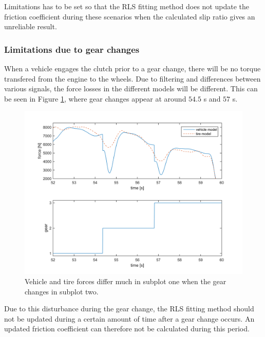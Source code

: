 Limitations has to be set so that the RLS fitting method does not update the friction coefficient during these scenarios when the calculated slip ratio gives an unreliable result.

\subsubsection{Limitations due to gear changes}
\label{sec:gearchange}
When a vehicle engages the clutch prior to a gear change, there will be no torque transfered from the engine to the wheels. Due to filtering and differences between various signals, the force losses in the different models will be different. This can be seen in Figure \ref{gear_change}, where gear changes appear at around $ 54.5 $ s and $ 57 $ s.

\begin{figure}[h]
	\centering
	\includegraphics[width=1.0\textwidth]{Pictures/gear_change}
	\caption {Vehicle and tire forces differ much in subplot one when the gear changes in subplot two.}
	\label{gear_change}
\end{figure}

Due to this disturbance during the gear change, the RLS fitting method should not be updated during a certain amount of time after a gear change occurs. An updated friction coefficient can therefore not be calculated during this period. 

